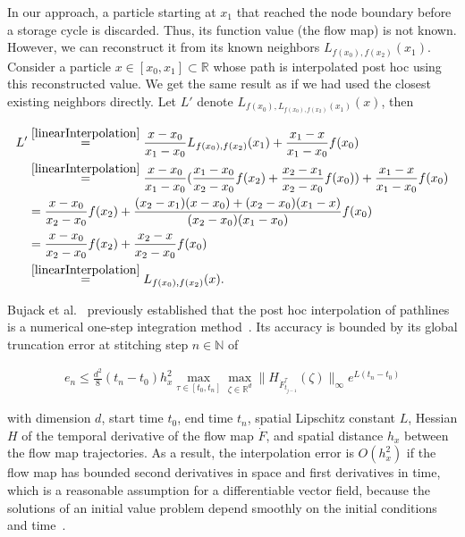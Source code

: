 In our approach, a particle starting at $x_1$ that reached the node boundary before a storage cycle is discarded.
%
Thus, its function value (the flow map) is not known. 
%
However, we can reconstruct it from its known neighbors $L_{f(x_0),f(x_2)}(x_1)$. 
%
Consider a particle $x\in[x_0,x_1]\subset\mathbb R$ whose path is interpolated post hoc using this reconstructed value. 
%
We get the same result as if we had used the closest existing neighbors directly. Let $L'$ denote $L_{f(x_0),L_{f(x_0),f(x_2)}(x_1)}(x)$, then
%
\begin{footnotesize}
\begin{eqnarray}
\begin{aligned}\label{doubleInterpolation}
L' &\overset{\eqref{linearInterpolation}}= \frac{x-x_0}{x_1-x_0}L_{f(x_0),f(x_2)}(x_1) + \frac{x_1-x}{x_1-x_0}f(x_0)\\
&\overset{\eqref{linearInterpolation}}= \frac{x-x_0}{x_1-x_0}(\frac{x_1-x_0}{x_2-x_0}f(x_2) + \frac{x_2-x_1}{x_2-x_0}f(x_0)) + \frac{x_1-x}{x_1-x_0}f(x_0)\\
&= \frac{x-x_0}{x_2-x_0}f(x_2) + \frac{(x_2-x_1)(x-x_0)+(x_2-x_0)(x_1-x)}{(x_2-x_0)(x_1-x_0)} f(x_0)\\
&= \frac{x-x_0}{x_2-x_0}f(x_2) + \frac{x_2-x}{x_2-x_0}f(x_0)\\
&\overset{\eqref{linearInterpolation}}= L_{f(x_0),f(x_2)}(x).
\end{aligned}
\end{eqnarray}
\end{footnotesize}
%
Bujack et al.~\cite{bujack2015lagrangian} previously established that the post hoc interpolation 
of pathlines is a numerical one-step integration method~\cite{GH10}. 
%
Its accuracy is bounded by its global truncation error at stitching step $n\in\mathbb N$ of 
%
\begin{footnotesize}
\begin{equation}
\begin{aligned}\label{global}
e_{n}\leq\frac {d^2}8(t_n-t_0) h_x^2\max_{\tau\in[t_0,t_n]}\max_{\zeta\in\mathbb R^d}
\| H_{{\dot F}_{t_{j-1}}^{\tau}}(\zeta)\|_{\infty}e^{L(t_n-t_0)}
\end{aligned}
\end{equation}
\end{footnotesize}
%
with dimension $d$, start time $t_0$, end time $t_n$, spatial Lipschitz constant $L$, Hessian $H$ of the temporal derivative of the flow map $\dot F$, and spatial distance $h_x$ between the flow map trajectories.
%
%
As a result, the interpolation error is $O(h_x^2)$ if the flow map has bounded second derivatives in space and first derivatives in time, which is a reasonable assumption for a differentiable vector field, because the solutions of an initial value problem depend smoothly on the initial conditions and time~\cite{hartman1973ordinary}.
%

